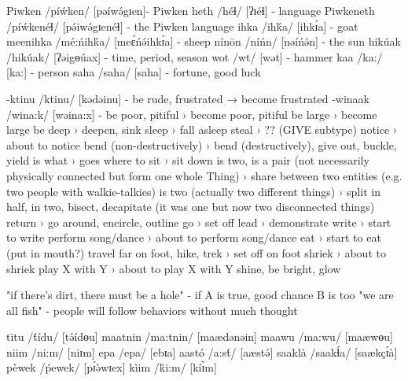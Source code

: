 Piwken /píẃken/ [pə\'iw\'əgɪen]- Piwken
heth /héɬ/ [ʔɪéɬ] - language
Piwkeneth /píẃkenéɬ/ [pə́iwə́gɪenéɬ] - the Piwken language
ihka /ih\'ka/ [ihk\'ɪa] - goat
meenihka /mé:ńihḱa/ [meɛ́ńə́ihkɪ́a] - sheep
n\'in\=on /níńn/ [nəíńə́n] - the sun
hik\'uak /hikúak/ [ʔəigɵúax] - time, period, season
wot /wt/ [wət] - hammer 
kaa /ka:/ [ka:] - person
saha /saha/ [saha] - fortune, good luck

-ktinu /ktinu/ [kədəinu] - be rude, frustrated → become frustrated
-winaak /wina:k/ [wəina:x] - be poor, pitiful › become poor, pitiful
be large › become large
be deep › deepen, sink
sleep › fall asleep
steal › ?? (GIVE subtype)
notice › about to notice
bend (non-destructively) › bend (destructively), give out, buckle, yield
is what › goes where to
sit › sit down
is two, is a pair (not necessarily physically connected but form one whole Thing) › share between two entities (e.g. two people with walkie-talkies)
is two (actually two different things) › split in half, in two, bisect, decapitate (it was one but now two disconnected things)
return › go around, encircle, outline
go › set off
lead › demonstrate
write › start to write
perform song/dance › about to perform song/dance
eat › start to eat (put in mouth?)
travel far on foot, hike, trek › set off on foot
shriek › about to shriek
play X with Y › about to play X with Y
shine, be bright, glow

"if there's dirt, there must be a hole" - if A is true, good chance B is too
"we are all fish" - people will follow behaviors without much thought

tītu /t́ídu/ [tə́ídɵu]
maatnin /ma:tnin/ [maædənəin]
maawu /ma:wu/ [maæwɵu]
niim /ni:m/ [niɪm]
epa /epa/ [ebɪa]
aastó /a:st́/ [aæstə́]
saaklà /saakɬ́a/ [saækçɪ́à]
pèwek /ṕewek/ [pɪ́ə̀wɪex]
kìim /ḱi:m/ [kíɪ̀m]

